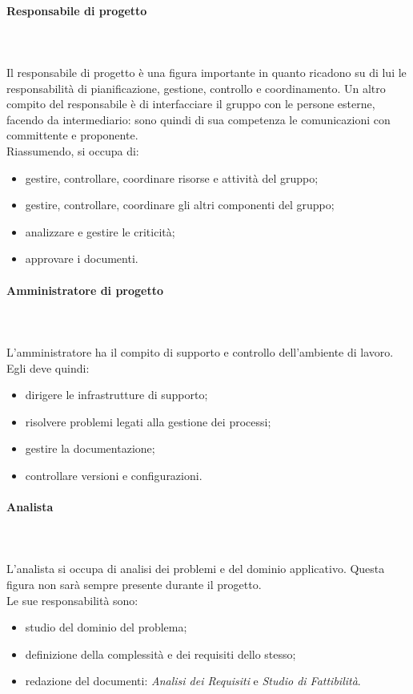 			\paragraph{Responsabile di progetto} \mbox{}\\ \mbox{}\\
			Il responsabile di progetto è una figura importante in quanto 
			ricadono su di lui le responsabilità di pianificazione, gestione, 
			controllo e coordinamento. Un altro compito del responsabile è di 
			interfacciare il gruppo con le persone esterne, facendo da 
			intermediario: sono quindi di sua competenza le comunicazioni con 
			committente e proponente. \\
			Riassumendo, si occupa di:
			\begin{itemize}
				\item gestire, controllare, coordinare risorse e attività del gruppo;
				\item  gestire, controllare, coordinare gli altri componenti del gruppo;
				\item analizzare e gestire le criticità;
				\item approvare i documenti.
			\end{itemize}
			\paragraph{Amministratore di progetto} \mbox{}\\ \mbox{}\\
			L'amministratore ha il compito di supporto e controllo dell'ambiente di lavoro. \\
			Egli deve quindi:
			\begin{itemize}
				\item dirigere le infrastrutture di supporto;
				\item risolvere problemi legati alla gestione dei processi;
				\item gestire la documentazione;
				\item controllare versioni e configurazioni.%
			\end{itemize}
			\paragraph{Analista} \mbox{}\\ \mbox{}\\
			L'analista si occupa di analisi dei problemi e del dominio applicativo. Questa figura non sarà sempre presente durante il progetto. \\
			Le sue responsabilità sono:
			\begin{itemize}
				\item studio del dominio del problema;
				\item definizione della complessità  e dei requisiti dello stesso;
				\item redazione del documenti: \textit{Analisi dei Requisiti} e \textit{Studio di Fattibilità}.
			\end{itemize}
